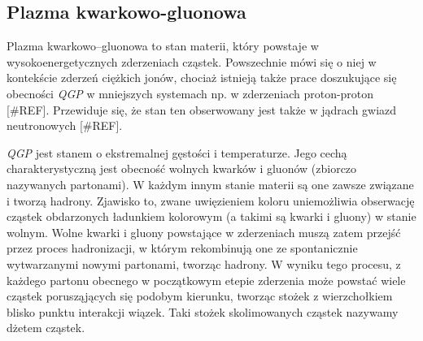 \subsection{Plazma kwarkowo-gluonowa}
\label{subsec:qgp}

Plazma kwarkowo--gluonowa  to stan materii, który powstaje w wysokoenergetycznych zderzeniach cząstek. Powszechnie mówi się o niej w kontekście zderzeń ciężkich jonów, chociaż istnieją także prace doszukujące się obecności \textit{QGP} w mniejszych systemach np. w zderzeniach proton-proton [\#REF]. Przewiduje się, że stan ten obserwowany jest także w jądrach gwiazd neutronowych [\#REF].

\textit{QGP} jest stanem o ekstremalnej gęstości i temperaturze. Jego cechą charakterystyczną jest obecność wolnych kwarków i gluonów (zbiorczo nazywanych partonami). 
W każdym innym stanie materii są one zawsze związane i tworzą hadrony. Zjawisko to, zwane uwięzieniem koloru  uniemożliwia obserwację cząstek obdarzonych ładunkiem kolorowym (a takimi są kwarki i gluony) w stanie wolnym.
Wolne kwarki i gluony powstające w zderzeniach muszą zatem przejść przez proces hadronizacji, w którym  rekombinują one ze spontanicznie wytwarzanymi nowymi partonami, tworząc hadrony. W wyniku tego procesu, z każdego partonu obecnego w początkowym etepie zderzenia może powstać wiele cząstek porusząjących się podobym kierunku, tworząc stożek z wierzchołkiem blisko punktu interakcji wiązek. Taki stożek skolimowanych cząstek nazywamy dżetem cząstek.




